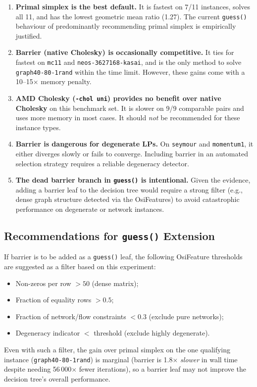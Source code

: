 \documentclass[11pt,a4paper]{article}
\begin{document}
\begin{enumerate}
  \item \textbf{Primal simplex is the best default.}  It is fastest on 7/11
        instances, solves all 11, and has the lowest geometric mean ratio
        (1.27).  The current \texttt{guess()} behaviour of predominantly
        recommending primal simplex is empirically justified.

  \item \textbf{Barrier (native Cholesky) is occasionally competitive.}
        It ties for fastest on \texttt{mc11} and \texttt{neos-3627168-kasai},
        and is the only method to solve \texttt{graph40-80-1rand} within
        the time limit.  However, these gains come with a 10--15$\times$
        memory penalty.

  \item \textbf{AMD Cholesky (\texttt{-chol uni}) provides no benefit over
        native Cholesky} on this benchmark set.  It is slower on 9/9
        comparable pairs and uses more memory in most cases.  It should
        \emph{not} be recommended for these instance types.

  \item \textbf{Barrier is dangerous for degenerate LPs.}  On \texttt{seymour}
        and \texttt{momentum1}, it either diverges slowly or fails to
        converge.  Including barrier in an automated selection strategy
        requires a reliable degeneracy detector.

  \item \textbf{The dead barrier branch in \texttt{guess()} is intentional.}
        Given the evidence, adding a barrier leaf to the decision tree would
        require a strong filter (e.g., dense graph structure detected via the
        OsiFeatures) to avoid catastrophic performance on degenerate or
        network instances.
\end{enumerate}

\subsection{Recommendations for \texttt{guess()} Extension}

If barrier is to be added as a \texttt{guess()} leaf, the following
OsiFeature thresholds are suggested as a filter based on this experiment:
\begin{itemize}
  \item Non-zeros per row $> 50$ (dense matrix);
  \item Fraction of equality rows $> 0.5$;
  \item Fraction of network/flow constraints $< 0.3$ (exclude pure networks);
  \item Degeneracy indicator $< $ threshold (exclude highly degenerate).
\end{itemize}
Even with such a filter, the gain over primal simplex on the one qualifying
instance (\texttt{graph40-80-1rand}) is marginal (barrier is 1.8$\times$
\emph{slower} in wall time despite needing 56\,000$\times$ fewer iterations),
so a barrier leaf may not improve the decision tree's overall performance.
\end{document}
